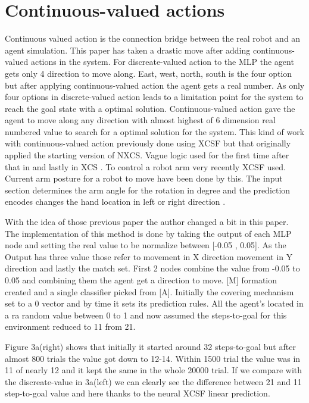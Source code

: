 \documentclass[12pt]{article}
\begin{document}
\section{Continuous-valued actions}
\label{sec:verify}
Continuous valued action is the connection bridge between the real robot and an agent simulation. This paper has taken a drastic move after adding continuous-valued actions in the system. For discreate-valued action to the MLP the agent gets only 4 direction to move along. East, west, north, south is the four option but after applying continuous-valued action the agent gets a real number. As only four options in discrete-valued action leads to a limitation point for the system to reach the goal state with a optimal solution. Continuous-valued action gave the agent to move along any direction with almost highest of 6 dimension real numbered value to search for a optimal solution for the system. This kind of work with continuous-valued action previously done using XCSF but that originally applied \cite{WilsonPrediction2001FunctionAW} the starting version of NXCS. Vague logic used for the first time \cite{10.11415/1276958.1277327} after that in \cite{10.1007/3-540-45027-0_5} and lastly in XCS \cite{4286961}. To control a robot arm very recently \cite{10.1145/1389095.1389360} XCSF used. Current arm posture for a robot to move have been done by this. The input section determines the arm angle for the rotation in degree and the prediction encodes changes the hand location in left or right direction \cite{349978}. 

With the idea of those previous paper the author changed a bit in this paper. The implementation of this method is done by taking the output of each MLP node and setting the real value to be normalize between [-0.05 , 0.05]. As the Output has three value those refer to movement in X direction movement in Y direction and lastly the match set. First 2 nodes combine the value from -0.05 to 0.05 and combining them the agent get a direction to move. [M] formation created and a single classifier picked from [A]. Initially the covering mechanism set to a 0 vector and by time it sets its prediction rules. All the agent’s located in a ra random value between 0 to 1 and now assumed the steps-to-goal for this environment reduced to 11 from 21.

Figure 3a(right) shows that initially it started around 32 steps-to-goal but after almost 800 trials the value got down to 12-14. Within 1500 trial the value was in 11 of nearly 12 and it kept the same in the whole 20000 trial. If we compare with the discreate-value in 3a(left) we can clearly see the difference between 21 and 11 step-to-goal value and here thanks to the neural XCSF linear prediction.
\end{document}
